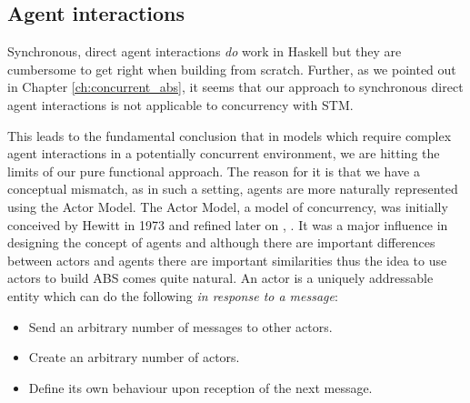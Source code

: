 \subsection{Agent interactions}
Synchronous, direct agent interactions \textit{do} work in Haskell but they are cumbersome to get right when building from scratch. Further, as we pointed out in Chapter \ref{ch:concurrent_abs}, it seems that our approach to synchronous direct agent interactions is not applicable to concurrency with STM. 

This leads to the fundamental conclusion that in models which require complex agent interactions in a potentially concurrent environment, we are hitting the limits of our pure functional approach. The reason for it is that we have a conceptual mismatch, as in such a setting, agents are more naturally represented using the Actor Model. The Actor Model, a model of concurrency, was initially conceived by Hewitt in 1973 \cite{hewitt_universal_1973} and refined later on \cite{hewitt_what_2007}, \cite{hewitt_actor_2010}. It was a major influence in designing the concept of agents and although there are important differences between actors and agents there are important similarities thus the idea to use actors to build ABS comes quite natural. %
An actor is a uniquely addressable entity which can do the following \textit{in response to a message}:
\begin{itemize}
	\item Send an arbitrary number of messages to other actors.
	\item Create an arbitrary number of actors.
	\item Define its own behaviour upon reception of the next message.
\end{itemize}

